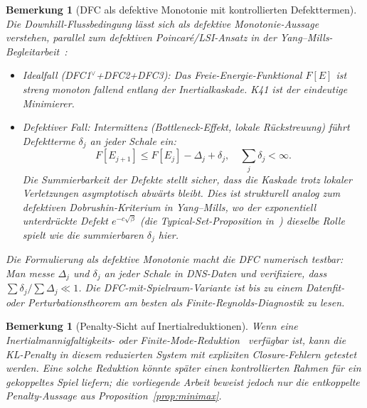 \documentclass[12pt,a4paper]{article}
\theoremstyle{breakdef}
\theoremstyle{breakplain}
\theoremstyle{breakdef}
\newtheorem{remark}[definition]{Bemerkung}
\begin{document}
\begin{remark}[DFC als defektive Monotonie mit kontrollierten Defekttermen]
\label{rem:dfc-defective-monotonicity}
Die Downhill-Flussbedingung lässt sich als \emph{defektive Monotonie}-Aussage verstehen, parallel zum defektiven Poincar\'{e}/LSI-Ansatz in der Yang--Mills-Begleitarbeit~\cite{Geiger2026-YM}:
\begin{itemize}
\item \emph{Idealfall (DFC1$^\vee$+DFC2+DFC3):} Das Freie-Energie-Funktional $F[E]$ ist streng monoton fallend entlang der Inertialkaskade. K41 ist der eindeutige Minimierer.
\item \emph{Defektiver Fall:} Intermittenz (Bottleneck-Effekt, lokale Rückstreuung) führt Defektterme $\delta_j$ an jeder Schale ein:
\[
F[E_{j+1}] \leq F[E_j] - \Delta_j + \delta_j, \quad \sum_j \delta_j < \infty.
\]
Die Summierbarkeit der Defekte stellt sicher, dass die Kaskade trotz lokaler Verletzungen \glqq asymptotisch abwärts\grqq{} bleibt. Dies ist strukturell analog zum defektiven Dobrushin-Kriterium in Yang--Mills, wo der exponentiell unterdrückte Defekt $e^{-c\sqrt{\beta}}$ (die Typical-Set-Proposition in~\cite{Geiger2026-YM}) dieselbe Rolle spielt wie die summierbaren $\delta_j$ hier.
\end{itemize}
Die Formulierung als defektive Monotonie macht die DFC \emph{numerisch testbar}: Man messe $\Delta_j$ und $\delta_j$ an jeder Schale in DNS-Daten und verifiziere, dass $\sum \delta_j / \sum \Delta_j \ll 1$. Die DFC-mit-Spielraum-Variante ist bis zu einem Datenfit- oder Perturbationstheorem am besten als Finite-Reynolds-Diagnostik zu lesen.
\end{remark}

\begin{remark}[Penalty-Sicht auf Inertialreduktionen]
\label{rem:minimax-inertial}
Wenn eine Inertialmannigfaltigkeits- oder Finite-Mode-Reduktion~\cite{FoiasSellTemam88}
verfügbar ist, kann die KL-Penalty in diesem reduzierten System mit expliziten
Closure-Fehlern getestet werden. Eine solche Reduktion könnte später einen
kontrollierten Rahmen für ein gekoppeltes Spiel liefern; die vorliegende Arbeit
beweist jedoch nur die entkoppelte Penalty-Aussage aus
Proposition~\ref{prop:minimax}.
\end{remark}


\end{document}
